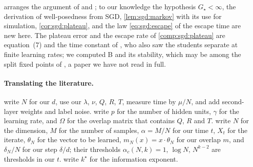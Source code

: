 \begin{refsection}
 arranges the argument of \textcite{GoldtEtAl2020a} and \textcite{VeigaEtAl2022}; to our knowledge the hypothesis $G_\star<\infty$, the derivation of well-posedness from SGD, \cref{lem:sgd:markov} with its use for simulation, \cref{cor:sgd:plateau}, and the law \eqref{eq:sgd:escape} of the escape time are new here. The plateau error and the escape rate of \cref{comp:sgd:plateau} are equation~(7) and the time constant of \textcite{SaadSolla1995c}, who also saw the students separate at finite learning rates; we computed B and its stability, which may be among the split fixed points of \textcite{BiehlRieglerWohler1996}, a paper we have not read in full.

\paragraph{Translating the literature.} \Textcite{GoldtEtAl2020a} write $N$ for our $d$, use our $\lambda$, $\nu$, $Q$, $R$, $T$, measure time by $\mu/N$, and add second-layer weights and label noise. \Textcite{VeigaEtAl2022} write $p$ for the number of hidden units, $\gamma$ for the learning rate, and $\Omega$ for the overlap matrix that contains $Q$, $R$ and $T$. \Textcite{BenArousGheissariJagannath2021} write $N$ for the dimension, $M$ for the number of samples, $\alpha=M/N$ for our time $t$, $X_t$ for the iterate, $\theta_N$ for the vector to be learned, $m_N(x)=x\cdot\theta_N$ for our overlap $m$, and $\delta_N/N$ for our step $\delta/d$; their thresholds $\alpha_c(N,k)=1$, $\log N$, $N^{k-2}$ are thresholds in our $t$. \Textcite{DamianEtAl2023} write $k^\star$ for the information exponent.

\printchapterbib
\end{refsection}
